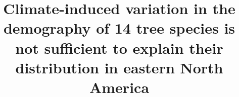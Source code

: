 \documentclass[letterpaper, 12pt]{article}
\title{Climate-induced variation in the demography of 14 tree species is not sufficient to explain their distribution in eastern North America}
\author{}
\theoremstyle{theo}
\begin{document}
\maketitle

\begin{onehalfspace}








\end{onehalfspace}

\begin{refcontext}[sorting=nyt]
\printbibliography
\end{refcontext}






% 
% 
% 
% 
% 
% 
% 
\end{document}
